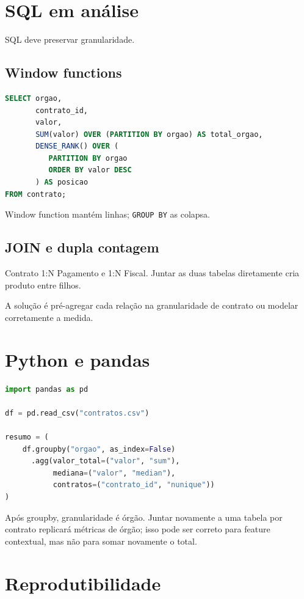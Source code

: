 \section{SQL em análise}

SQL deve preservar granularidade.

\subsection{Window functions}

\begin{lstlisting}[language=SQL]
SELECT orgao,
       contrato_id,
       valor,
       SUM(valor) OVER (PARTITION BY orgao) AS total_orgao,
       DENSE_RANK() OVER (
          PARTITION BY orgao
          ORDER BY valor DESC
       ) AS posicao
FROM contrato;
\end{lstlisting}

Window function mantém linhas; \texttt{GROUP BY} as colapsa.

\subsection{JOIN e dupla contagem}

Contrato 1:N Pagamento e 1:N Fiscal. Juntar as duas tabelas diretamente cria produto entre filhos.

A solução é pré-agregar cada relação na granularidade de contrato ou modelar corretamente a medida.

\section{Python e pandas}

\begin{lstlisting}[language=Python]
import pandas as pd

df = pd.read_csv("contratos.csv")

resumo = (
    df.groupby("orgao", as_index=False)
      .agg(valor_total=("valor", "sum"),
           mediana=("valor", "median"),
           contratos=("contrato_id", "nunique"))
)
\end{lstlisting}

Após groupby, granularidade é órgão. Juntar novamente a uma tabela por contrato replicará métricas de órgão; isso pode ser correto para feature contextual, mas não para somar novamente o total.

\section{Reprodutibilidade}

